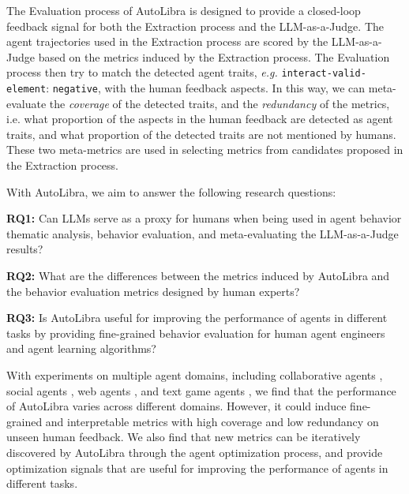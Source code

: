 The Evaluation process of AutoLibra is designed to provide a closed-loop feedback signal for both the Extraction process
and the LLM-as-a-Judge. The agent trajectories used in the Extraction process are scored by the LLM-as-a-Judge based
on the metrics induced by the Extraction process. The Evaluation process then try to match the detected agent traits,
\emph{e.g.} \texttt{interact-valid-element}: \texttt{negative}, with the human feedback aspects.
In this way, we can meta-evaluate the \emph{coverage} of the detected traits, and the \emph{redundancy} of the metrics,
i.e. what proportion of the aspects in the human feedback are detected as agent traits,
and what proportion of the detected traits are not mentioned by humans. These two meta-metrics are used in selecting
metrics from candidates proposed in the Extraction process.



With AutoLibra, we aim to answer the following research questions:

\textbf{RQ1:} Can LLMs serve as a proxy for humans when being used in agent behavior thematic analysis,
    behavior evaluation, and meta-evaluating the LLM-as-a-Judge results?

\textbf{RQ2:}    What are the differences between the metrics induced by AutoLibra and the behavior evaluation
    metrics designed by human experts?

\textbf{RQ3:}    Is AutoLibra useful for improving the performance of agents in different tasks by 
    providing fine-grained behavior evaluation for human agent engineers and agent learning algorithms?


With experiments on multiple agent domains, including collaborative agents \citep{shao2024collaborative}, social agents 
\citep{zhousotopia}, web agents \citep{zhouwebarena,he2024webvoyager}, and text game agents \citep{paglieri2024balrog,cloos2024babaaibreakrules}, 
we find that the performance of AutoLibra varies across different domains. 
However, it could induce fine-grained and interpretable metrics with high coverage and low redundancy on unseen human feedback.
We also find that new metrics can be iteratively discovered by AutoLibra through the agent optimization process,
and provide optimization signals that are useful for improving the performance of agents in different tasks.




